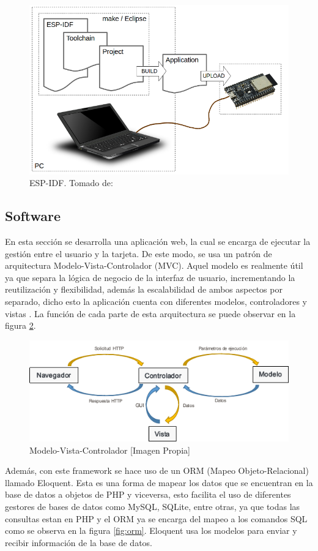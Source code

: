 \begin{figure}[!t]
	\centering
	\caption{ESP-IDF. Tomado de: \cite{ES}}
	\label{fig:what-you-need}
	\includegraphics[width=0.7\linewidth]{Imagenes/what-you-need}
\end{figure}

\subsection{Software}

En esta sección se desarrolla una aplicación web, la cual se encarga de ejecutar la gestión entre el usuario y la tarjeta. De este modo, se usa un patrón de arquitectura Modelo-Vista-Controlador (MVC). Aquel modelo es realmente útil ya que separa la lógica de negocio de la interfaz de usuario, incrementando la reutilización y flexibilidad, además la escalabilidad de ambos aspectos por separado, dicho esto la aplicación cuenta con diferentes modelos, controladores y vistas \cite{MVC1}. La función de cada parte de esta arquitectura se puede observar en la figura \ref{fig:mvc}.\\

\begin{figure}[!t]
	\centering
	\caption{Modelo-Vista-Controlador [Imagen Propia]}
	\label{fig:mvc}
	\includegraphics[width=0.8\linewidth]{Imagenes/MVC}
\end{figure}

Además, con este framework se hace uso de un ORM (Mapeo Objeto-Relacional) llamado Eloquent. Esta es una forma de mapear los datos que se encuentran en la base de datos a objetos de PHP y viceversa, esto facilita el uso de diferentes gestores de bases de datos como MySQL, SQLite, entre otras, ya que todas las consultas estan en PHP y el ORM ya se encarga del mapeo a los comandos SQL como se observa en la figura \ref{fig:orm}. Eloquent usa los modelos para enviar y recibir información de la base de datos\cite{Eloq}.\\

